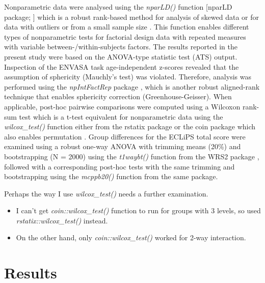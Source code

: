 \documentclass[a4paper, twoside]{templates/ociamthesis}
\providecommand{\tightlist}{%
  \setlength{\itemsep}{0pt}\setlength{\parskip}{0pt}}
\begin{document}
Nonparametric data were analysed using the \emph{nparLD()} function {[}nparLD package; \textcite{nparLDPackageR}{]} which is a robust rank-based method for analysis of skewed data or for data with outliers or from a small sample size \autocite[see][ for a good introduction to robust nonparametric techniques]{Feys2016}. This function enables different types of nonparametric tests for factorial design data with repeated measures with variable between-/within-subjects factors. The results reported in the present study were based on the ANOVA-type statistic test (ATS) output. Inspection of the ENVASA task age-independent z-scores revealed that the assumption of sphericity (Mauchly's test) was violated. Therefore, analysis was performed using the \emph{npIntFactRep} package \autocite{npIntFactRepPackageR}, which is another robust aligned-rank technique that enables sphericity correction (Greenhouse-Geisser). When applicable, post-hoc pairwise comparisons were computed using a Wilcoxon rank-sum test which is a t-test equivalent for nonparametric data using the \emph{wilcox\_test()} function either from the rstatix package \autocite{rstatixPackageR} or the coin package which also enables permutation \autocite{CoinPackageR}. Group differences for the ECLiPS total score were examined using a robust one-way ANOVA with trimming means (20\%) and bootstrapping (N = 2000) using the \emph{t1waybt()} function from the WRS2 package \autocite{WRS2PackageR}, followed with a corresponding post-hoc tests with the same trimming and bootstrapping using the \emph{mcppb20()} function from the same package.\\

\begin{correction}
Perhaps the way I use \emph{wilcox\_test()} needs a further examination.

\begin{itemize}
\tightlist
\item
  I can't get \emph{coin::wilcox\_test()} function to run for groups
  with 3 levels, so used \emph{rstatix::wilcox\_test()} instead.
\item
  On the other hand, only \emph{coin::wilcox\_test()} worked for 2-way
  interaction.
\end{itemize}
\end{correction}

\hypertarget{results-3}{%
\section{Results}\label{results-3}}
\end{document}
